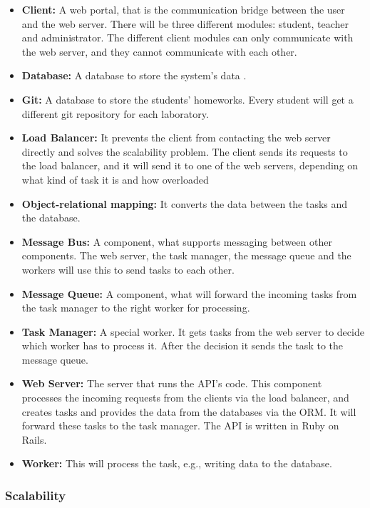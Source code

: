 \begin{itemize}
	\item \textbf{Client:} A web portal, that is the communication bridge between the user and the web server. There will be three different modules: student, teacher and administrator. The different client modules can only communicate with the web server, and they cannot communicate with each other.
	\item \textbf{Database:} A database to store the system's data . 
	\item \textbf{Git:} A database to store the students' homeworks. Every student will get a different git repository for each laboratory.
	\item \textbf{Load Balancer:} It prevents the client from contacting the web server directly and solves the scalability problem. The client sends its requests to the load balancer, and it will send it to one of the web servers, depending on what kind of task it is and how overloaded
	\item \textbf{Object-relational mapping:} It converts the data between the tasks and the database. 
	\item \textbf{Message Bus:} A component, what supports messaging between other components. The web server, the task manager, the message queue and the workers will use this to send tasks to each other.
	\item \textbf{Message Queue:} A component, what will forward the incoming tasks from the task manager to the right worker for processing.
	\item \textbf{Task Manager:} A special worker. It gets tasks from the web server to decide which worker has to process it. After the decision it sends the task to the message queue.
	\item \textbf{Web Server:} The server that runs the API's code. This component processes the incoming requests from the clients via the load balancer, and creates tasks and provides the data from the databases via the ORM. It will forward these tasks to the task manager. The API is written in Ruby on Rails. 
	\item \textbf{Worker:} This will process the task, e.g., writing data to the database.
\end{itemize}

\subsubsection{Scalability}


